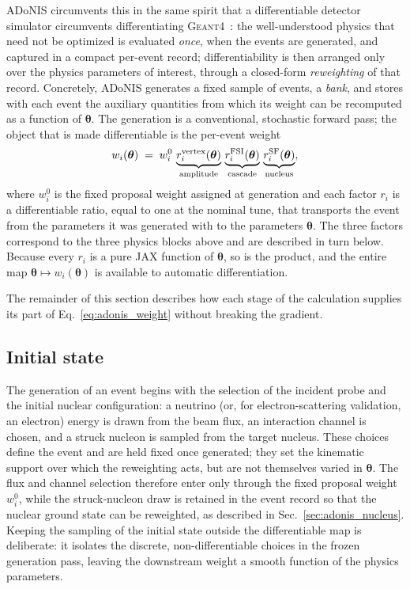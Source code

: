 \documentclass[aps,prd,reprint,superscriptaddress,nofootinbib,amsmath,amssymb,floatfix]{revtex4-1}
\newcommand{\adonis}{{ADoNIS}\xspace}
\begin{document}
\adonis circumvents this in the same spirit that a differentiable detector
simulator circumvents differentiating \textsc{Geant4}~\cite{LUCiD}: the
well-understood physics that need not be optimized is evaluated \emph{once}, when
the events are generated, and captured in a compact per-event record;
differentiability is then arranged only over the physics parameters of interest,
through a closed-form \emph{reweighting} of that record. Concretely, \adonis
generates a fixed sample of events, a \emph{bank}, and stores with each event the
auxiliary quantities from which its weight can be recomputed as a function of
$\bm\theta$. The generation is a conventional, stochastic forward pass; the object
that is made differentiable is the per-event weight
\begin{equation}
\label{eq:adonis_weight}
w_i(\bm\theta) \;=\; w_i^{0}\,
\underbrace{r^{\rm vertex}_i(\bm\theta)}_{\text{amplitude}}\,
\underbrace{r^{\rm FSI}_i(\bm\theta)}_{\text{cascade}}\,
\underbrace{r^{\rm SF}_i(\bm\theta)}_{\text{nucleus}},
\end{equation}
where $w_i^{0}$ is the fixed proposal weight assigned at generation and each
factor $r_i$ is a differentiable ratio, equal to one at the nominal tune, that
transports the event from the parameters it was generated with to the parameters
$\bm\theta$. The three factors correspond to the three physics blocks above and
are described in turn below. Because every $r_i$ is a pure JAX function of
$\bm\theta$, so is the product, and the entire map
$\bm\theta \mapsto w_i(\bm\theta)$ is available to automatic differentiation.

The remainder of this section describes how each stage of the calculation
supplies its part of Eq.~\ref{eq:adonis_weight} without breaking the gradient.

\subsection{Initial state}
\label{sec:adonis_initial}

The generation of an event begins with the selection of the incident probe and
the initial nuclear configuration: a neutrino (or, for electron-scattering
validation, an electron) energy is drawn from the beam flux, an interaction
channel is chosen, and a struck nucleon is sampled from the target nucleus.
These choices define the event and are held fixed once generated; they set the
kinematic support over which the reweighting acts, but are not themselves varied
in $\bm\theta$. The flux and channel selection therefore enter only through the
fixed proposal weight $w_i^{0}$, while the struck-nucleon draw is retained in the
event record so that the nuclear ground state can be reweighted, as described in
Sec.~\ref{sec:adonis_nucleus}. Keeping the sampling of the initial state outside
the differentiable map is deliberate: it isolates the discrete, non-differentiable
choices in the frozen generation pass, leaving the downstream weight a smooth
function of the physics parameters.
\end{document}
